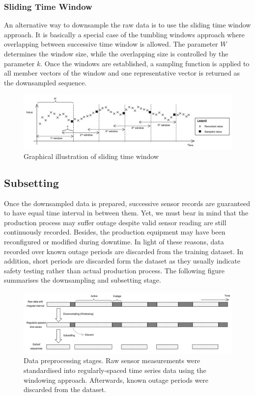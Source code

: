 \documentclass[11pt]{article} %
\theoremstyle{plain}
\theoremstyle{definition}
\begin{document}
\subsubsection{Sliding Time Window}

An alternative way to downsample the raw data is to use the sliding time window approach. It is basically a special case of the tumbling windows approach where overlapping between successive time window is allowed. The parameter \(W\) determines the window size, while the overlapping size is controlled by the parameter \(k\). Once the windows are established, a sampling function is applied to all member vectors of the window and one representative vector is returned as the downsampled sequence. 

\begin{figure}[H]
	\centering
	\includegraphics[width=1\textwidth]{sliding_time_window.PNG}
	\caption{Graphical illustration of sliding time window}
	\label{fig:sliding_time_window}
\end{figure}


\subsection{Subsetting}

Once the downsampled data is prepared, successive sensor records are guaranteed to have equal time interval in between them. Yet, we must bear in mind that the production process may suffer outage despite valid sensor reading are still continuously recorded. Besides, the production equipment may have been reconfigured or modified during downtime. In light of these reasons, data recorded over known outage periods are discarded from the training dataset. In addition, short periods are discarded form the dataset as they usually indicate safety testing rather than actual production process. The following figure summarises the downsampling and subsetting stage.

\begin{figure}[H]
	\centering
	\includegraphics[width=1\textwidth]{preprocessing.PNG}
	\caption{Data preprocessing stages. Raw sensor measurements were standardised into regularly-spaced time series data using the windowing approach. Afterwards, known outage periods were discarded from the dataset. }
	\label{fig:preprocessing}
\end{figure}
\end{document}
